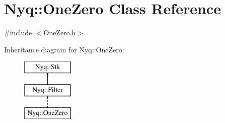 \hypertarget{class_nyq_1_1_one_zero}{}\section{Nyq\+:\+:One\+Zero Class Reference}
\label{class_nyq_1_1_one_zero}


{\ttfamily \#include $<$One\+Zero.\+h$>$}

Inheritance diagram for Nyq\+:\+:One\+Zero\+:\begin{figure}[H]
\begin{center}
\leavevmode
\includegraphics[height=3.000000cm]{class_nyq_1_1_one_zero}
\end{center}
\end{figure}

